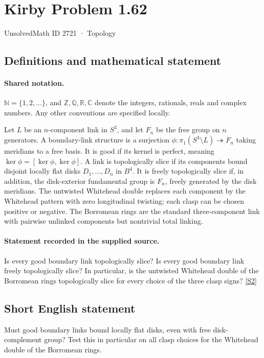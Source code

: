\documentclass[11pt]{article}
\newcommand{\sref}[2]{\hyperlink{source:#1:#2}{[S#2]}}
\begin{document}
\setcounter{section}{2720}
\section{Kirby Problem 1.62}\label{2721}
{\small\sffamily UnsolvedMath ID 2721 · Topology}
\subsection{Definitions and mathematical statement}

\paragraph{Shared notation.}$\mathbb N=\{1,2,\ldots\}$, and $\mathbb Z,\mathbb Q,\mathbb R,\mathbb C$ denote the integers, rationals, reals and complex numbers. Any other conventions are specified locally.


Let $L$ be an $n$-component link in $S^3$, and let $F_n$ be the free group on $n$ generators. A boundary-link structure is a surjection $\phi:\pi_1(S^3\setminus L)\twoheadrightarrow F_n$ taking meridians to a free basis. It is good if its kernel is perfect, meaning $\ker\phi=[\ker\phi,\ker\phi]$. A link is topologically slice if its components bound disjoint locally flat disks $D_1,\ldots,D_n$ in $B^4$. It is freely topologically slice if, in addition, the disk-exterior fundamental group is $F_n$, freely generated by the disk meridians. The untwisted Whitehead double replaces each component by the Whitehead pattern with zero longitudinal twisting; each clasp can be chosen positive or negative. The Borromean rings are the standard three-component link with pairwise unlinked components but nontrivial total linking.
\paragraph{Statement recorded in the supplied source.}
Is every good boundary link topologically slice? Is every good boundary link freely topologically slice? In particular, is the untwisted Whitehead double of the Borromean rings topologically slice for every choice of the three clasp signs? \sref{2721}{2}

\subsection{Short English statement}
Must good boundary links bound locally flat disks, even with free disk-complement group? Test this in particular on all clasp choices for the Whitehead double of the Borromean rings.
\end{document}
